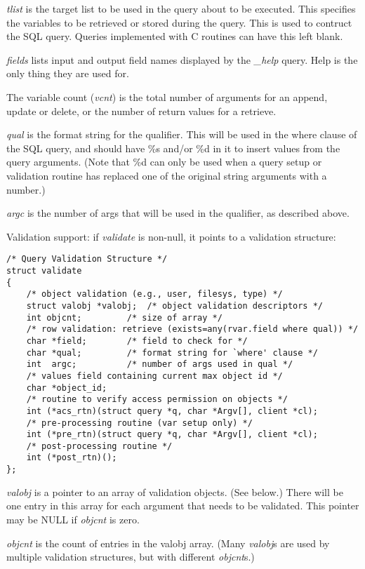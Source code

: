 {\it tlist\/} is the target list to be used in the query about to be
executed. This specifies the variables to be retrieved or stored
during the query. This is used to contruct the SQL query. Queries
implemented with C routines can have this left blank.

{\it fields\/} lists input and output field names displayed by the
{\it \_help\/} query. Help is the only thing they are used for.

The variable count ({\it vcnt\/}) is the total number of arguments for an
append, update or delete, or the number of return values for a
retrieve.

{\it qual\/} is the format string for the qualifier. This will be used
in the where clause of the SQL query, and should have \%s and/or \%d
in it to insert values from the query arguments. (Note that \%d can
only be used when a query setup or validation routine has replaced one
of the original string arguments with a number.)

{\it argc\/} is the number of args that will be used in the qualifier, as
described above.

\bigskip

\noindent Validation support: if {\it validate\/} is non-null, it
points to a validation structure:

\begin{verbatim}
/* Query Validation Structure */
struct validate
{
    /* object validation (e.g., user, filesys, type) */
    struct valobj *valobj;	/* object validation descriptors */
    int objcnt;			/* size of array */
    /* row validation: retrieve (exists=any(rvar.field where qual)) */
    char *field;		/* field to check for */
    char *qual;			/* format string for `where' clause */
    int  argc;			/* number of args used in qual */
    /* values field containing current max object id */
    char *object_id;
    /* routine to verify access permission on objects */
    int (*acs_rtn)(struct query *q, char *Argv[], client *cl);
    /* pre-processing routine (var setup only) */
    int (*pre_rtn)(struct query *q, char *Argv[], client *cl);
    /* post-processing routine */
    int (*post_rtn)();
};
\end{verbatim}

{\it valobj\/} is a pointer to an array of validation objects. (See
below.) There will be one entry in this array for each argument that
needs to be validated. This pointer may be NULL if {\it objcnt\/} is
zero.

{\it objcnt\/} is the count of entries in the valobj array. (Many {\it
valobj\/}s are used by multiple validation structures, but with
different {\it objcnt\/}s.)

